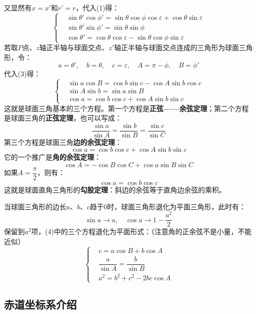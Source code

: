 \documentclass[a4paper]{article}
\renewcommand\epsilon{\varepsilon}
\begin{document}
又显然有$x=x'$和$r'=r$，代入(1)得：
\begin{equation}
    \begin{cases}
        & \sin\theta'\cos\phi' = \sin\theta\cos\phi\cos\epsilon + \cos\theta\sin\epsilon \\
        & \sin\theta'\sin\phi' = \sin\theta\sin\phi \\
        & \cos\theta' = \cos\theta\cos\epsilon - \sin\theta\cos\phi\sin\epsilon
    \end{cases}
\end{equation}
若取$P$点、$z$轴正半轴与球面交点、$z'$轴正半轴与球面交点连成的三角形为球面三角形，令：
\[
    a = \theta',\quad b = \theta,\quad c = \epsilon,\quad
    A = \pi - \phi,\quad B = \phi'
\]
代入(3)得：
\begin{equation}
    \begin{cases}
        & \sin a\cos B = \cos b\sin c - \cos A\sin b\cos c \\
        & \sin A\sin b = \sin a\sin B \\
        & \cos a = \cos b\cos c + \cos A\sin b\sin c
    \end{cases}
\end{equation}
这就是球面三角基本的三个方程。第一个方程是\textbf{正弦——余弦定理}；第二个方程是球面三角的\textbf{正弦定理}，也可以写成：
\[
    \boxed{
        \frac{\sin a}{\sin A} = \frac{\sin b}{\sin B} = \frac{\sin c}{\sin C}
    }
\]
第三个方程是球面三角\textbf{边的余弦定理}：
\[
    \boxed{
        \cos a = \cos b\cos c + \cos A\sin b\sin c
    }
\]
它的一个推广是\textbf{角的余弦定理}：
\[
    \boxed{
        \cos A = -\cos B\cos C + \cos a\sin B\sin C
    }
\]
如果$A = \dfrac{\pi}{2}$，则有：
\[
    \boxed{
        \cos a = \cos b\cos c
    }
\]
这就是球面直角三角形的\textbf{勾股定理}：斜边的余弦等于直角边余弦的乘积。

当球面三角形的边长$a$、$b$、$c$趋于0时，球面三角形退化为平面三角形，此时有：
\[
    \sin a \to a,\quad \cos a \to 1 - \frac{a^2}{2}
\]
保留到$a^2$项，(4)中的三个方程退化为平面形式：（注意角的正余弦不是小量，不能近似）
\begin{equation}
    \begin{cases}
        & c = a\cos B + b\cos A \\
        & \dfrac{a}{\sin A} = \dfrac{b}{\sin B} \\
        & a^2 = b^2 + c^2 - 2bc\cos A
    \end{cases}
\end{equation}

\subsection{赤道坐标系介绍}
\end{document}
